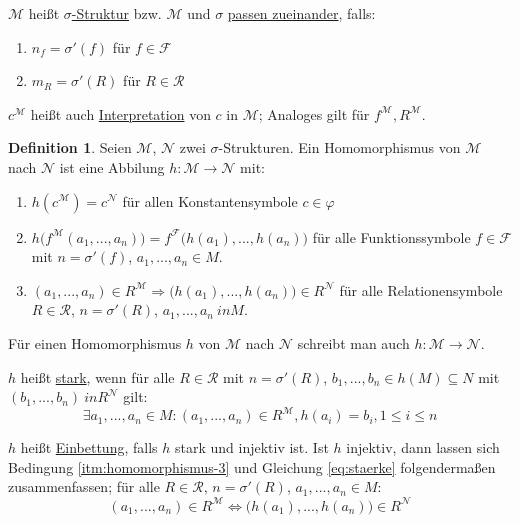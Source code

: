 \documentclass{article}
\theoremstyle{definition}
\newtheorem{dfn}{Definition}
\newcommand{\calF}{\mathcal{F}}
\newcommand{\calM}{\mathcal{M}}
\newcommand{\calN}{\mathcal{N}}
\newcommand{\calR}{\mathcal{R}}
\begin{document}
    $ \calM $ heißt \underline{$ \sigma $-Struktur} bzw. $ \calM $ und $ \sigma $ \underline{passen zueinander}, falls:
    \begin{enumerate}
        \item $ n_f = \sigma'(f) $ für $ f \in \calF $
        \item $ m_R = \sigma'(R) $ für $ R \in \calR $
    \end{enumerate}

    $ c^\calM $ heißt auch \underline{Interpretation} von $ c $ in $ \calM $; Analoges gilt für $ f^\calM, R^\calM $.

    \begin{dfn}
        Seien $ \calM $, $ \calN $ zwei $ \sigma $-Strukturen.
        Ein Homomorphismus von $ \calM $ nach $ \calN $ ist eine Abbilung $ h : \calM \rightarrow \calN $ mit:
        \begin{enumerate}
            \item $ h(c^\calM) = c^\calN $ für allen Konstantensymbole $ c \in \varphi $
            \item $ h\big(f^\calM(a_1, ..., a_n)\big) = f^\calF\big(h(a_1), ..., h(a_n)\big) $ für alle Funktionssymbole $ f \in \calF $ mit $ n = \sigma'(f) $, $ a_1, ..., a_n \in M $.
            \item \label{itm:homomorphismus-3} $ (a_1, ..., a_n) \in R^\calM \Rightarrow \big(h(a_1), ..., h(a_n)) \in R^\calN $ für alle Relationensymbole $ R \in \calR $, $ n = \sigma'(R) $, $ a_1, ..., a_n \ in M $.
        \end{enumerate}
    \end{dfn}

    Für einen Homomorphismus $ h $ von $ \calM $ nach $ \calN $ schreibt man auch $ h : \calM \rightarrow \calN $.

    $ h $ heißt \underline{stark}, wenn für alle $ R \in \calR $ mit $ n = \sigma'(R) $, $ b_1, ..., b_n \in h(M) \subseteq N $ mit $ (b_1, ..., b_n) \ in R^\calN $ gilt:
    \begin{equation}
        \label{eq:staerke}
        \exists a_1, ..., a_n \in M : (a_1, ..., a_n) \in R^\calM, h(a_i) = b_i, 1 \leq i \leq n
    \end{equation}

    $ h $ heißt \underline{Einbettung}, falls $ h $ stark und injektiv ist.
    Ist $ h $ injektiv, dann lassen sich Bedingung \ref{itm:homomorphismus-3} und Gleichung \eqref{eq:staerke} folgendermaßen zusammenfassen; für alle $ R \in \calR $, $ n = \sigma'(R) $, $ a_1, ..., a_n \in M $:
    \begin{equation}
        (a_1, ..., a_n) \in R^\calM \Leftrightarrow \big(h(a_1), ..., h(a_n)\big) \in R^\calN
    \end{equation}
\end{document}
